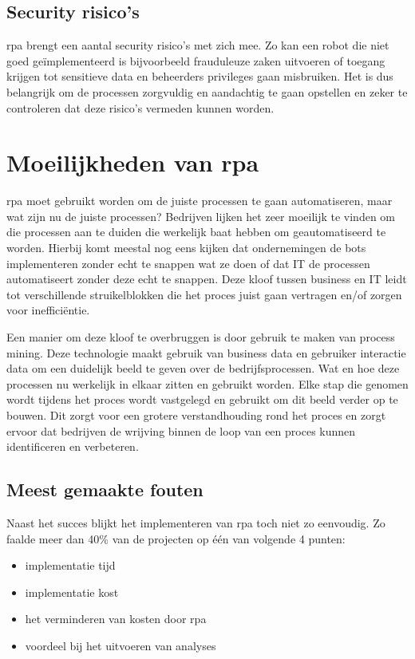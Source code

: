 \subsection{Security risico's}
\acrshort{rpa} brengt een aantal security risico's met zich mee. Zo kan een robot die niet goed geïmplementeerd is bijvoorbeeld frauduleuze zaken uitvoeren of toegang krijgen tot sensitieve data en beheerders privileges gaan misbruiken. Het is dus belangrijk om de processen zorgvuldig en aandachtig te gaan opstellen en zeker te controleren dat deze risico's vermeden kunnen worden. \autocite{everythingRPA} \autocite{predictionRPA}

\section{Moeilijkheden van \acrshort{rpa}}
\acrshort{rpa} moet gebruikt worden om de juiste processen te gaan automatiseren, maar wat zijn nu de juiste processen? Bedrijven lijken het zeer moeilijk te vinden om die processen aan te duiden die werkelijk baat hebben om geautomatiseerd te worden. Hierbij komt meestal nog eens kijken dat ondernemingen de bots implementeren zonder echt te snappen wat ze doen of dat IT de processen automatiseert zonder deze echt te snappen. Deze kloof tussen business en IT leidt tot verschillende struikelblokken die het proces juist gaan vertragen en/of zorgen voor inefficiëntie. \autocite{cFutRPA}

Een manier om deze kloof te overbruggen is door gebruik te maken van process mining. Deze technologie maakt gebruik van business data en gebruiker interactie data om een duidelijk beeld te geven over de bedrijfsprocessen. Wat en hoe deze processen nu werkelijk in elkaar zitten en gebruikt worden. Elke stap die genomen wordt tijdens het proces wordt vastgelegd en gebruikt om dit beeld verder op te bouwen. Dit zorgt voor een grotere verstandhouding rond het proces en zorgt ervoor dat bedrijven de wrijving binnen de loop van een proces kunnen identificeren en verbeteren. \autocite{cFutRPA}

\subsection{Meest gemaakte fouten}
Naast het succes blijkt het implementeren van \acrshort{rpa} toch niet zo eenvoudig. Zo faalde meer dan 40\% van de projecten op één van volgende 4 punten:
\begin{itemize}
	\item implementatie tijd
	\item implementatie kost
	\item het verminderen van kosten door \acrshort{rpa}
	\item voordeel bij het uitvoeren van analyses
\end{itemize}


